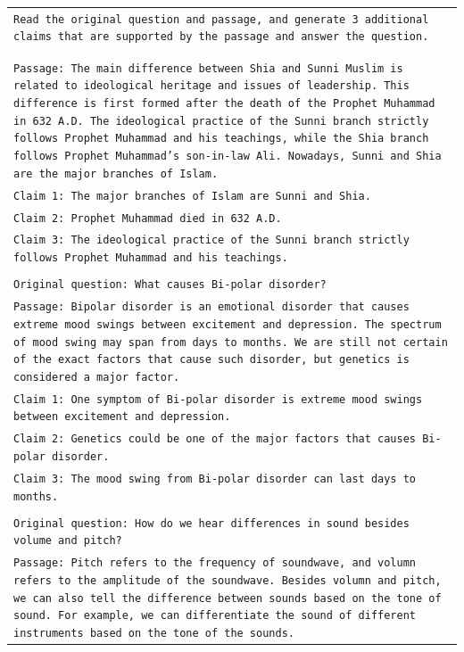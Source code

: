\begin{table}[ht]
    \centering
    \small
    \begin{tabular}{>{\raggedright\arraybackslash\tt}p{}<{}}
        \toprule
            Read the original question and passage, and generate 3 additional claims that are supported by the passage and answer the question.
            \\\\
            \noindent {Original question: What's the difference between Shia vs. Sunni Islam?}\\
            Passage: The main difference between Shia and Sunni Muslim is related to ideological heritage and issues of leadership. This difference is first formed after the death of the Prophet Muhammad in 632 A.D. The ideological practice of the Sunni branch strictly follows Prophet Muhammad and his teachings, while the Shia branch follows Prophet Muhammad's son-in-law Ali. Nowadays, Sunni and Shia are the major branches of Islam. \\
            Claim 1: The major branches of Islam are Sunni and Shia. \\
            Claim 2: Prophet Muhammad died in 632 A.D. \\
            Claim 3: The ideological practice of the Sunni branch strictly follows Prophet Muhammad and his teachings. \\\\
            Original question: What causes Bi-polar disorder? \\
            Passage: Bipolar disorder is an emotional disorder that causes extreme mood swings between excitement and depression. The spectrum of mood swing may span from days to months. We are still not certain of the exact factors that cause such disorder, but genetics is considered a major factor. \\
            Claim 1: One symptom of Bi-polar disorder is extreme mood swings between excitement and depression.\\
            Claim 2: Genetics could be one of the major factors that causes Bi-polar disorder.\\
            Claim 3: The mood swing from Bi-polar disorder can last days to months.\\\\
            Original question: How do we hear differences in sound besides volume and pitch?\\
            Passage: Pitch refers to the frequency of soundwave, and volumn refers to the amplitude of the soundwave. Besides volumn and pitch, we can also tell the difference between sounds based on the tone of sound. For example, we can differentiate the sound of different instruments based on the tone of the sounds.\\

\end{tabular}
\end{table}
